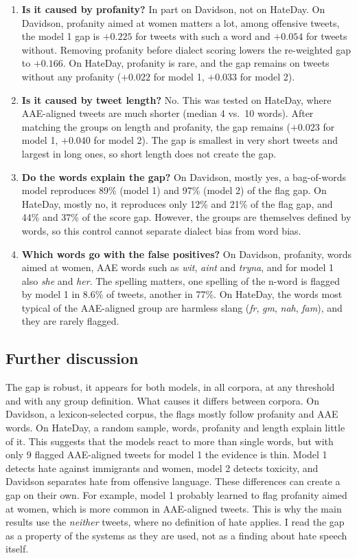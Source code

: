 \documentclass[runningheads,a4paper,oribibl]{llncs}
\begin{document}
\begin{enumerate}
\item \textbf{Is it caused by profanity?} In part on Davidson, not on HateDay. On Davidson,
profanity aimed at women matters a lot, among offensive tweets, the model 1 gap is $+0.225$
for tweets with such a word and $+0.054$ for tweets without. Removing profanity before dialect
scoring lowers the re-weighted gap to $+0.166$. On HateDay, profanity is rare, and the gap
remains on tweets without any profanity ($+0.022$ for model 1, $+0.033$ for model 2).

\item \textbf{Is it caused by tweet length?} No. This was tested on HateDay, where AAE-aligned
tweets are much shorter (median 4 vs.\ 10 words). After matching the groups on length and
profanity, the gap remains ($+0.023$ for model 1, $+0.040$ for model 2). The gap is smallest in
very short tweets and largest in long ones, so short length does not create the gap.

\item \textbf{Do the words explain the gap?} On Davidson, mostly yes, a bag-of-words model
reproduces 89\% (model 1) and 97\% (model 2) of the flag gap. On HateDay, mostly no, it
reproduces only 12\% and 21\% of the flag gap, and 44\% and 37\% of the score gap. However,
the groups are themselves defined by words, so this control cannot separate dialect bias from
word bias.

\item \textbf{Which words go with the false positives?} On Davidson, profanity, words aimed at
women, AAE words such as \emph{wit}, \emph{aint} and \emph{tryna}, and for model 1 also
\emph{she} and \emph{her}. The spelling matters, one spelling of the n-word is flagged by model
1 in 8.6\% of tweets, another in 77\%. On HateDay, the words most typical of the AAE-aligned
group are harmless slang (\emph{fr}, \emph{gm}, \emph{nah}, \emph{fam}), and they are rarely
flagged.

\end{enumerate}

\subsection{Further discussion}
The gap is robust, it appears for both models, in all corpora, at
any threshold and with any group definition. What causes it differs between corpora. On
Davidson, a lexicon-selected corpus, the flags mostly follow profanity and AAE words. On
HateDay, a random sample, words, profanity and length explain little of it. This suggests that
the models react to more than single words, but with only 9 flagged AAE-aligned tweets for
model 1 the evidence is thin.
Model 1 detects hate against immigrants and women,
model 2 detects toxicity, and Davidson separates hate from offensive language. These
differences can create a gap on their own. For example, model 1 probably learned to flag
profanity aimed at women, which is more common in AAE-aligned tweets. This is why the main
results use the \emph{neither} tweets, where no definition of hate applies. I read the gap as
a property of the systems as they are used, not as a finding about hate speech itself.
\end{document}
